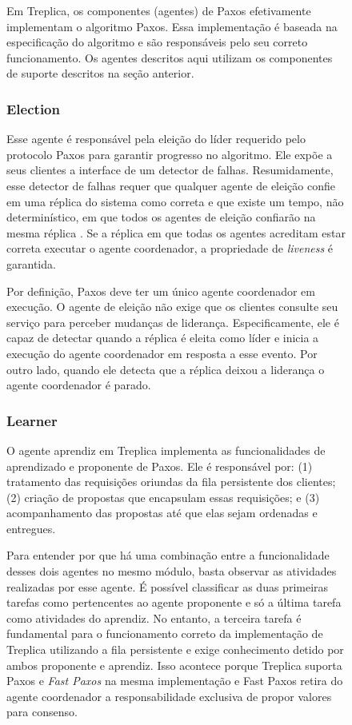 \begin{figure}[ht]
Em Treplica, os componentes (agentes) de Paxos efetivamente implementam o algoritmo Paxos.
Essa implementação é baseada na especificação do algoritmo e são responsáveis pelo seu
correto funcionamento. Os agentes descritos aqui utilizam os componentes de suporte
descritos na seção anterior.

\subsubsection{Election}

Esse agente é responsável pela eleição do líder requerido pelo protocolo Paxos para
garantir progresso no algoritmo. Ele expõe a seus clientes a interface de um \Omega
detector de falhas. Resumidamente, esse detector de falhas requer que qualquer agente de
eleição confie em uma réplica do sistema como correta e que existe um tempo, não
determinístico, em que todos os agentes de eleição confiarão na mesma réplica
\cite{chandra96}. Se a réplica em que todas os agentes acreditam estar correta executar o
agente coordenador, a propriedade de \emph{liveness} é garantida.

Por definição, Paxos deve ter um único agente coordenador em execução. O agente de eleição
não exige que os clientes consulte seu serviço para perceber mudanças de liderança.
Especificamente, ele é capaz de detectar quando a réplica é eleita como líder e inicia a
execução do agente coordenador em resposta a esse evento. Por outro lado, quando ele
detecta que a réplica deixou a liderança o agente coordenador é parado.

\subsubsection{Learner}

O agente aprendiz em Treplica implementa as funcionalidades de aprendizado e proponente de
Paxos. Ele é responsável por: (1) tratamento das requisições oriundas da fila persistente
dos clientes; (2) criação de propostas que encapsulam essas requisições; e (3)
acompanhamento das propostas até que elas sejam ordenadas e entregues.

Para entender por que há uma combinação entre a funcionalidade desses dois agentes no
mesmo módulo, basta observar as atividades realizadas por esse agente. É possível
classificar as duas primeiras tarefas como pertencentes ao agente proponente e só a última
tarefa como atividades do aprendiz. No entanto, a terceira tarefa é fundamental para
o funcionamento correto da implementação de Treplica utilizando a fila persistente e exige
conhecimento detido por ambos proponente e aprendiz. Isso acontece porque Treplica
suporta Paxos e \emph{Fast Paxos} \cite{lamport06a} na mesma implementação e Fast Paxos
retira do agente coordenador a responsabilidade exclusiva de propor valores para consenso.


\end{figure}
